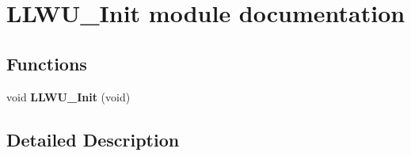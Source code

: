 \hypertarget{group___l_l_w_u___init__module}{}\section{L\+L\+W\+U\+\_\+\+Init module documentation}
\label{group___l_l_w_u___init__module}
\subsection*{Functions}
\begin{DoxyCompactItemize}
\item 
void {\bfseries L\+L\+W\+U\+\_\+\+Init} (void)\hypertarget{group___l_l_w_u___init__module_ga920c1bf9439ad9f53f45a6a71ed03f79}{}\label{group___l_l_w_u___init__module_ga920c1bf9439ad9f53f45a6a71ed03f79}

\end{DoxyCompactItemize}


\subsection{Detailed Description}
